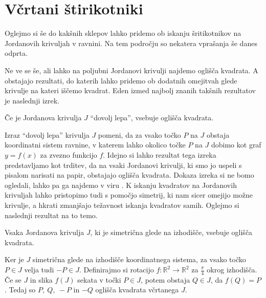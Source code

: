 \documentclass[mat1]{fmfdelo}
\newcommand{\R}{\mathbb R}
\begin{document}
\section{Včrtani štirikotniki}
Oglejmo si še do kakšnih sklepov lahko pridemo ob iskanju šritikotnikov na Jordanovih krivuljah v ravnini. Na tem področju so nekatera vprašanja še danes odprta. 

Ne ve se še, ali lahko na poljubni Jordanovi krivulji najdemo oglišča kvadrata. A obstajajo rezultati, do katerih lahko pridemo ob dodatnih omejitvah glede krivulje na kateri iščemo kvadrat. Eden izmed najbolj znanih takšnih rezultatov je naslednji izrek.

\begin{izrek}
Če je Jordanova krivulja $J$ ``dovolj lepa'', vsebuje oglišča kvadrata.
\end{izrek}

Izraz ``dovolj lepa'' krivulja $J$ pomeni, da za vsako točko $P$ na $J$ obstaja koordinatni sistem ravnine, v katerem lahko okolico točke $P$ na $J$ dobimo kot graf $y = f(x)$ za zvezno funkcijo $f$. Idejno si lahko rezultat tega izreka predstavljamo kot trditev, da na vsaki Jordanovi krivulji, ki smo jo uspeli s pisalom narisati na papir, obstajajo oglišča kvadrata. Dokaza izreka si ne bomo ogledali, lahko pa ga najdemo v viru \cite{izrek_stromquist}. K iskanju kvadratov na Jordanovih krivuljah lahko pristopimo tudi s pomočjo simetrij, ki nam sicer omejijo možne krivulje, a hkrati zmanjšajo težavnost iskanja kvadratov samih. Oglejmo si naslednji rezultat na to temo.

\begin{trditev}\label{trd:kvadrat}
Vsaka Jordanova krivulja $J$, ki je simetrična glede na izhodišče, vsebuje oglišča kvadrata.
\end{trditev}

\proof
Ker je $J$ simetrična glede na izhodišče koordinatnega sistema, za vsako točko $P \in J$ velja tudi $-P \in J$. Definirajmo si rotacijo $f \colon \R^2 \to \R^2$ za $\frac{\pi}{4}$ okrog izhodišča. Če se $J$ in slika $f(J)$ sekata v točki $P \in J$, potem obstaja $Q \in J$, da $f(Q) = P$. Tedaj so $P,~Q,~-P$ in $-Q$ oglišča kvadrata včrtanega $J$.

\begin{center}
\end{center}
\end{document}
